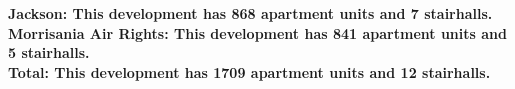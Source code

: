 \bf{Jackson}: This development has 868 apartment units and 7 stairhalls.\\\bf{Morrisania Air Rights}: This development has 841 apartment units and 5 stairhalls.\\\bf{Total}: This development has 1709 apartment units and 12 stairhalls.\\